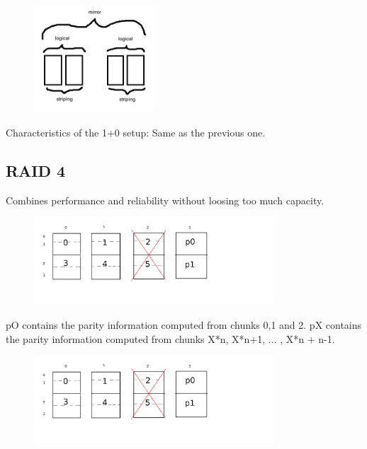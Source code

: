 \documentclass[a4paper,10pt]{report}
\begin{document}
\begin{figure}[h!]
  \begin{center}
    \includegraphics[width=0.4\textwidth]{1_plus_0.png}
    \caption{}
  \end{center}
\end{figure}
Characteristics of the 1+0 setup:
Same as the previous one. 

\subsection{RAID 4}

Combines performance and reliability without loosing too much capacity.

\begin{figure}[h!]
  \begin{center}
    \includegraphics[width=0.8\textwidth]{raid_4.png}
    \caption{}
  \end{center}
\end{figure}

pO contains the parity information computed from chunks 0,1 and 2.
pX contains the parity information computed from chunks X*n, X*n+1, ... , X*n + n-1.

\begin{figure}[h!]
  \begin{center}
    \includegraphics[width=0.8\textwidth]{raid_4.png}
    \caption{}
  \end{center}
\end{figure}
\end{document}

